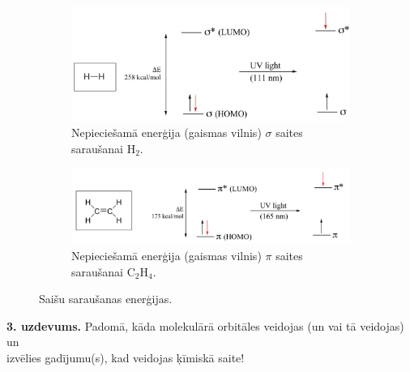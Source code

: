 \documentclass[12pt,a4paper]{article}
\newenvironment{taskbox}
{\begin{framed}\begin{minipage}{\textwidth}}
{\end{minipage}\end{framed}}
\begin{document}
\begin{figure}[H]
    \centering

    \begin{subfigure}[b]{0.45\textwidth}
        \centering
        \includegraphics[width=\textwidth]{atteli/H2.jpg}
        \caption{Nepieciešamā enerģija (gaismas vilnis) $\sigma$ saites saraušanai H$_2$.}
        \label{fig:h2}
    \end{subfigure}
    \hfill
    \begin{subfigure}[b]{0.45\textwidth}
        \centering
        \includegraphics[width=\textwidth]{atteli/pipi.png}
        \caption{Nepieciešamā enerģija (gaismas vilnis) $\pi$ saites saraušanai C$_2$H$_4$.}
        \label{fig:pipi}
    \end{subfigure}
    \caption{Saišu saraušanas enerģijas.}
    \label{sarausana}
\end{figure}

\begin{taskbox}
\textbf{3. uzdevums.} Padomā, kāda molekulārā orbitāles veidojas (un vai tā veidojas) un \\ 
izvēlies gadījumu(s), kad veidojas ķīmiskā saite!

\end{taskbox}
\end{document}

